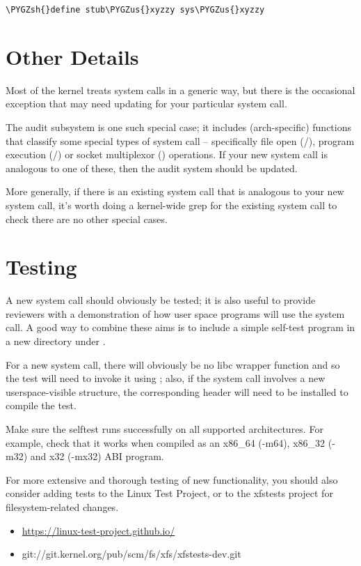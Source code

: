 \documentclass[a4paper,8pt,english]{sphinxmanual}
\def\PYGZus{\char`\_}
\def\PYGZsh{\char`\#}
\begin{document}
\begin{Verbatim}[commandchars=\\\{\}]
\PYGZsh{}define stub\PYGZus{}xyzzy sys\PYGZus{}xyzzy
\end{Verbatim}


\section{Other Details}
\label{process/adding-syscalls:other-details}
Most of the kernel treats system calls in a generic way, but there is the
occasional exception that may need updating for your particular system call.

The audit subsystem is one such special case; it includes (arch-specific)
functions that classify some special types of system call -- specifically
file open (/), program execution (/) or
socket multiplexor () operations. If your new system call is
analogous to one of these, then the audit system should be updated.

More generally, if there is an existing system call that is analogous to your
new system call, it's worth doing a kernel-wide grep for the existing system
call to check there are no other special cases.


\section{Testing}
\label{process/adding-syscalls:testing}
A new system call should obviously be tested; it is also useful to provide
reviewers with a demonstration of how user space programs will use the system
call.  A good way to combine these aims is to include a simple self-test
program in a new directory under .

For a new system call, there will obviously be no libc wrapper function and so
the test will need to invoke it using ; also, if the system call
involves a new userspace-visible structure, the corresponding header will need
to be installed to compile the test.

Make sure the selftest runs successfully on all supported architectures.  For
example, check that it works when compiled as an x86\_64 (-m64), x86\_32 (-m32)
and x32 (-mx32) ABI program.

For more extensive and thorough testing of new functionality, you should also
consider adding tests to the Linux Test Project, or to the xfstests project
for filesystem-related changes.
\begin{itemize}
\item {} 
\href{https://linux-test-project.github.io/}{https://linux-test-project.github.io/}

\item {} 
git://git.kernel.org/pub/scm/fs/xfs/xfstests-dev.git

\end{itemize}
\end{document}
